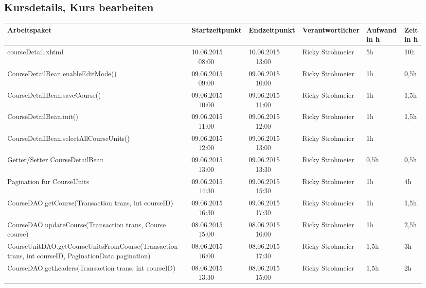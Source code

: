 \begin{landscape}
\subsection{Kursdetails, Kurs bearbeiten}
\begin{tabular}{|p{10.3cm}|p{3.2cm}|p{3.2cm}|p{3.5cm}|p{1.7cm}|p{1.5cm}|}
	\hline  \textbf{Arbeitspaket} & \textbf{Startzeitpunkt} & \textbf{Endzeitpunkt} & \textbf{Verantwortlicher}  & \textbf{Aufwand in h} & \textbf{Zeit in h}\\ 
	\hline   courseDetail.xhtml                                         & 10.06.2015 \ \ 08:00       & 10.06.2015  \ \  13:00     & Ricky Strohmeier  &  5h     & 10h \\
	\hline   CourseDetailBean.enableEditMode()                          & 09.06.2015 \ \ 09:00       & 09.06.2015  \ \  10:00     & Ricky Strohmeier  &  1h     & 0,5h\\
	\hline   CourseDetailBean.saveCourse()                              & 09.06.2015 \ \ 10:00       & 09.06.2015  \ \  11:00     & Ricky Strohmeier  &  1h     & 1,5h\\
	\hline   CourseDetailBean.init()                                    & 09.06.2015 \ \ 11:00       & 09.06.2015  \ \  12:00     & Ricky Strohmeier  &  1h     & 1,5h\\
	\hline   CourseDetailBean.selectAllCourseUnits()                    & 09.06.2015 \ \ 12:00       & 09.06.2015  \ \  13:00     & Ricky Strohmeier  &  1h     &     \\
	\hline   Getter/Setter CourseDetailBean                             & 09.06.2015 \ \ 13:00       & 09.06.2015  \ \  13:30     & Ricky Strohmeier  &  0,5h   & 0,5h\\
	\hline   Pagination für CourseUnits                                 & 09.06.2015 \ \ 14:30       & 09.06.2015  \ \  15:30     & Ricky Strohmeier  &  1h     &  4h \\
	\hline   CourseDAO.getCourse(Transaction trans, int courseID)       & 09.06.2015 \ \ 16:30       & 09.06.2015  \ \  17:30     & Ricky Strohmeier  &  1h     & 1,5h\\
	\hline   CourseDAO.updateCourse(Transaction trans, Course course)   & 08.06.2015 \ \ 15:00       & 08.06.2015  \ \  16:00     & Ricky Strohmeier  &  1h     & 2,5h\\
	\hline   CourseUnitDAO.getCourseUnitsFromCourse(Transaction trans, int courseID, PaginationData pagination) & 08.06.2015 \ \ 16:00       & 08.06.2015  \ \  17:30     & Ricky Strohmeier &  1,5h   &  3h \\
	\hline   CourseDAO.getLeaders(Transaction trans, int courseID)    & 08.06.2015 \ \ 13:30       & 08.06.2015  \ \  15:00     & Ricky Strohmeier  &  1,5h    & 2h\\
	\hline 
\end{tabular} \ \\
\ \\
	

\end{landscape}

